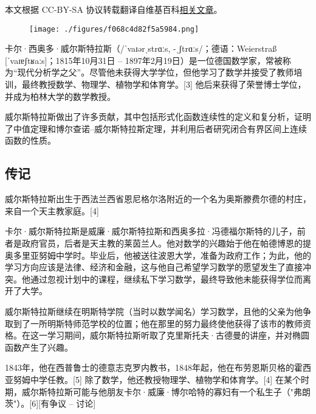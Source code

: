 
本文根据 CC-BY-SA 协议转载翻译自维基百科\href{https://en.wikipedia.org/wiki/Karl_Weierstrass}{相关文章}。
\begin{figure}[ht]
\centering
\texttt{[image: ./figures/f068c4d82f5a5984.png]}
\caption{} \label{fig_Karl_1}
\end{figure}
卡尔·西奥多·威尔斯特拉斯（/ˈvaɪərˌstrɑːs, -ˌʃtrɑːs/；德语：Weierstraß [ˈvaɪɐʃtʁaːs]；1815年10月31日 – 1897年2月19日）是一位德国数学家，常被称为“现代分析学之父”。尽管他未获得大学学位，但他学习了数学并接受了教师培训，最终教授数学、物理学、植物学和体育学。[3] 他后来获得了荣誉博士学位，并成为柏林大学的数学教授。

威尔斯特拉斯做出了许多贡献，其中包括形式化函数连续性的定义和复分析，证明了中值定理和博尔查诺–威尔斯特拉斯定理，并利用后者研究闭合有界区间上连续函数的性质。
\subsection{传记}
威尔斯特拉斯出生于西法兰西省恩尼格尔洛附近的一个名为奥斯滕费尔德的村庄，来自一个天主教家庭。[4]

卡尔·威尔斯特拉斯是威廉·威尔斯特拉斯和西奥多拉·冯德福尔斯特的儿子，前者是政府官员，后者是天主教的莱茵兰人。他对数学的兴趣始于他在帕德博恩的提奥多里亚努姆中学时。毕业后，他被送往波恩大学，准备为政府工作；为此，他的学习方向应该是法律、经济和金融，这与他自己希望学习数学的愿望发生了直接冲突。他通过忽视计划中的课程，继续私下学习数学，最终导致他未能获得学位而离开了大学。

威尔斯特拉斯继续在明斯特学院（当时以数学闻名）学习数学，且他的父亲为他争取到了一所明斯特师范学校的位置；他在那里的努力最终使他获得了该市的教师资格。在这一学习期间，威尔斯特拉斯听取了克里斯托夫·古德曼的讲座，并对椭圆函数产生了兴趣。

1843年，他在西普鲁士的德意志克罗内教书，1848年起，他在布劳恩斯贝格的霍西亚努姆中学任教。[5] 除了数学，他还教授物理学、植物学和体育学。[4] 在某个时期，威尔斯特拉斯可能与他朋友卡尔·威廉·博尔哈特的寡妇有一个私生子（"弗朗茨"）。[6][有争议 – 讨论]